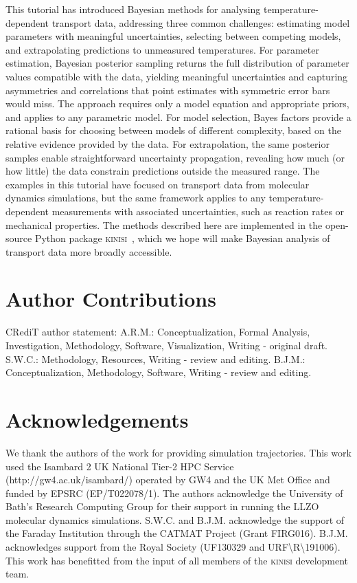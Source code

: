 \documentclass[reprint,superscriptaddress,nobibnotes,nofootinbib,amsmath,amssymb,aps,hidelinks]{revtex4-2}
\begin{document}
This tutorial has introduced Bayesian methods for analysing temperature-dependent transport data, addressing three common challenges: estimating model parameters with meaningful uncertainties, selecting between competing models, and extrapolating predictions to unmeasured temperatures.
For parameter estimation, Bayesian posterior sampling returns the full distribution of parameter values compatible with the data, yielding meaningful uncertainties and capturing asymmetries and correlations that point estimates with symmetric error bars would miss.
The approach requires only a model equation and appropriate priors, and applies to any parametric model.
For model selection, Bayes factors provide a rational basis for choosing between models of different complexity, based on the relative evidence provided by the data.
For extrapolation, the same posterior samples enable straightforward uncertainty propagation, revealing how much (or how little) the data constrain predictions outside the measured range.
The examples in this tutorial have focused on transport data from molecular dynamics simulations, but the same framework applies to any temperature-dependent measurements with associated uncertainties, such as reaction rates or mechanical properties.
The methods described here are implemented in the open-source Python package \textsc{kinisi}~\cite{McCluskey2024}, which we hope will make Bayesian analysis of transport data more broadly accessible.

\section*{Author Contributions}

CRediT author statement: 
A.R.M.: Conceptualization, Formal Analysis, Investigation, Methodology, Software, Visualization, Writing - original draft. 
S.W.C.: Methodology, Resources, Writing - review and editing. 
B.J.M.: Conceptualization, Methodology, Software, Writing - review and editing.

\section*{Acknowledgements}

We thank the authors of the  work for providing simulation trajectories.
This work used the Isambard 2 UK National Tier-2 HPC Service (http://gw4.ac.uk/isambard/) operated by GW4 and the UK Met Office and funded by EPSRC (EP/T022078/1). 
The authors acknowledge the University of Bath's Research Computing Group for their support in running the LLZO molecular dynamics simulations. 
S.W.C. and B.J.M. acknowledge the support of the Faraday Institution through the CATMAT Project (Grant FIRG016). 
B.J.M. acknowledges support from the Royal Society (UF130329 and URF\textbackslash R\textbackslash 191006).
This work has benefitted from the input of all members of the \textsc{kinisi} development team.
\end{document}
